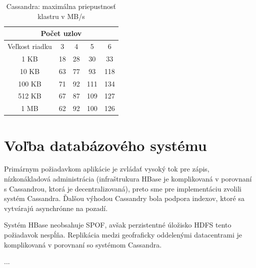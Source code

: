 \documentclass[11pt,twoside,a4paper]{book}
\begin{document}
\begin{table}[htp]
\begin{center}
\begin{tabular}{|c|c|c|c|c|}
\hline
\multicolumn{5}{|c|}{Počet uzlov}  \\
\hline Veľkost riadku & 3 & 4 & 5 & 6\\ 
\hline
\hline 1 KB & 18 & 28 & 30 & 33\\ 
\hline 10 KB & 63 & 77 & 93 & 118 \\ 
\hline 100 KB & 71 & 92 & 111 & 134\\ 
\hline 512 KB & 67 & 87 & 109 & 127\\  
\hline 1 MB & 62 & 92 & 100 & 126\\ 
\hline
\end{tabular} 
\end{center}
\caption{Cassandra: maximálna priepustnosť klastru v MB/s}
\label{tab:CPerf1}
\end{table}


\section{Voľba databázového systému}

Primárnym požiadavkom aplikácie je zvládať vysoký tok pre zápis, nízkonákladová administrácia (infraštrukura HBase je komplikovaná v porovnaní s Cassandrou, ktorá je decentralizovaná), preto sme pre implementáciu zvolili systém Cassandra. Ďalšou výhodou Cassandry bola podpora indexov, ktoré sa vytvárajú asynchrónne na pozadí.

Systém HBase neobsahuje SPOF, avšak perzistentné úložisko HDFS tento požiadavok nespĺňa. Replikácia medzi geofraficky oddelenými datacentrami je komplikovaná v porovnaní so systémom Cassandra.

... 
\end{document}
